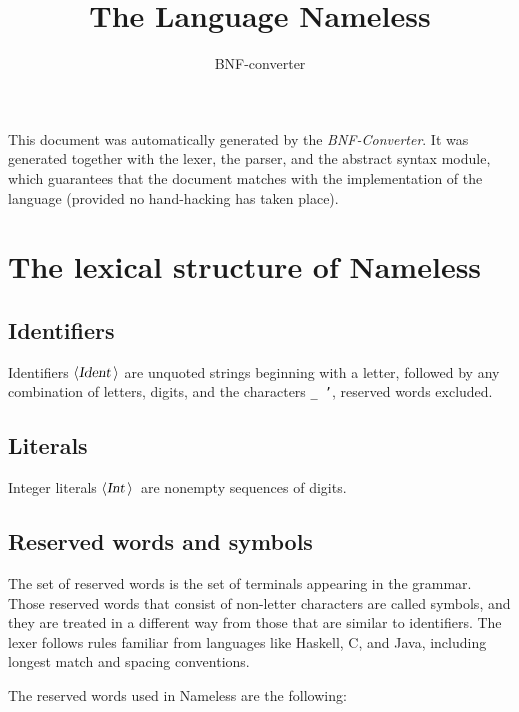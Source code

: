 \documentclass[a4paper,11pt]{article}
\title{The Language Nameless}
\author{BNF-converter}
\begin{document}
\maketitle


\newcommand{\emptyP}{\mbox{$\epsilon$}}
\newcommand{\terminal}[1]{\mbox{{\texttt {#1}}}}
\newcommand{\nonterminal}[1]{\mbox{$\langle \mbox{{\sl #1 }} \! \rangle$}}
\newcommand{\arrow}{\mbox{::=}}
\newcommand{\delimit}{\mbox{$|$}}
\newcommand{\reserved}[1]{\mbox{{\texttt {#1}}}}
\newcommand{\literal}[1]{\mbox{{\texttt {#1}}}}
\newcommand{\symb}[1]{\mbox{{\texttt {#1}}}}

This document was automatically generated by the {\em BNF-Converter}.
It was generated together with the lexer, the parser, and the
abstract syntax module, which guarantees that the document
matches with the implementation of the language
(provided no hand-hacking has taken place).

\section*{The lexical structure of Nameless}

\subsection*{Identifiers}
Identifiers \nonterminal{Ident} are unquoted strings beginning with a letter,
followed by any combination of letters, digits, and the characters {\tt \_ '},
reserved words excluded.
\subsection*{Literals}
Integer literals \nonterminal{Int}\ are nonempty sequences of digits.

\subsection*{Reserved words and symbols}
The set of reserved words is the set of terminals appearing in the grammar. Those reserved words that consist of non-letter characters are called symbols, and they are treated in a different way from those that are similar to identifiers. The lexer follows rules familiar from languages like Haskell, C, and Java, including longest match and spacing conventions.

The reserved words used in Nameless are the following: \\
\end{document}

